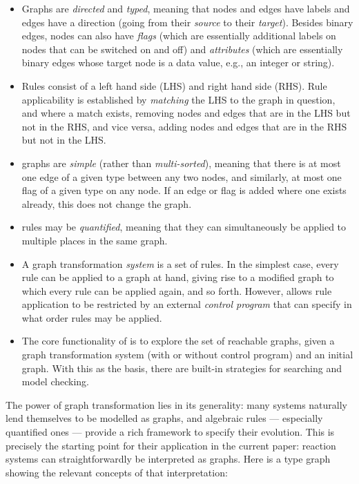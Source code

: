\begin{itemize}
\item Graphs are \emph{directed} and \emph{typed}, meaning that nodes and edges have labels and edges have a direction (going from their \emph{source} to their \emph{target}). Besides binary edges, nodes can also have \emph{flags} (which are essentially additional labels on nodes that can be switched on and off) and \emph{attributes} (which are essentially binary edges whose target node is a data value, e.g., an integer or string).

\item Rules consist of a left hand side (LHS) and right hand side (RHS). Rule applicability is established by \emph{matching} the LHS to the graph in question, and where a match exists, removing nodes and edges that are in the LHS but not in the RHS, and vice versa, adding nodes and edges that are in the RHS but not in the LHS.

\item \GROOVE graphs are \emph{simple} (rather than \emph{multi-sorted}), meaning that there is at most one edge of a given type between any two nodes, and similarly, at most one flag of a given type on any node. If an edge or flag is added where one exists already, this does not change the graph.

\item \GROOVE rules may be \emph{quantified}, meaning that they can simultaneously be applied to multiple places in the same graph.

\item A graph transformation \emph{system} is a set of rules. In the simplest case, every rule can be applied to a graph at hand, giving rise to a modified graph to which every rule can be applied again, and so forth. However, \GROOVE allows rule application to be restricted by an external \emph{control program} that can specify in what order rules may be applied.

\item The core functionality of \GROOVE is to explore the set of reachable graphs, given a graph transformation system (with or without control program) and an initial graph. With this as the basis, there are built-in strategies for searching and model checking.
\end{itemize}
%
The power of graph transformation lies in its generality: many systems naturally lend themselves to be modelled as graphs, and algebraic rules --- especially quantified ones --- provide a rich framework to specify their evolution. This is precisely the starting point for their application in the current paper: reaction systems can straightforwardly be interpreted as graphs. Here is a type graph showing the relevant concepts of that interpretation:


